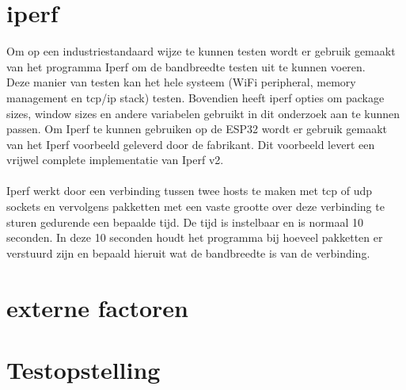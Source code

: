 \documentclass[../DCM2_Verslag.tex]{subfiles}
\begin{document}
\section{iperf}
Om op een industriestandaard wijze te kunnen testen wordt er gebruik gemaakt van het programma Iperf om de bandbreedte testen uit te kunnen voeren.\\
Deze manier van testen kan het hele systeem (WiFi peripheral, memory management en tcp/ip stack) testen. Bovendien heeft iperf opties om package sizes, window sizes en andere variabelen gebruikt in dit onderzoek aan te kunnen passen. Om Iperf te kunnen gebruiken op de ESP32 wordt er gebruik gemaakt van het Iperf voorbeeld geleverd door de fabrikant. Dit voorbeeld levert een vrijwel complete implementatie van Iperf v2.\\\\
Iperf werkt door een verbinding tussen twee hosts te maken met tcp of udp sockets en vervolgens pakketten met een vaste grootte over deze verbinding te sturen gedurende een bepaalde tijd. De tijd is instelbaar en is normaal 10 seconden. In deze 10 seconden houdt het programma bij hoeveel pakketten er verstuurd zijn en bepaald hieruit wat de bandbreedte is van de verbinding.\\

\section{externe factoren}

\section{Testopstelling}
\end{document}
